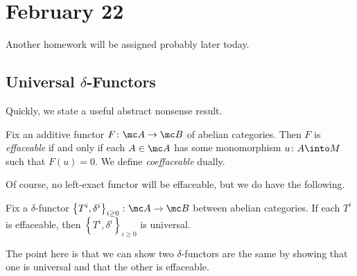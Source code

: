 \documentclass[../notes.tex]{subfiles}
\begin{document}
\section{February 22}

Another homework will be assigned probably later today.

\subsection{Universal \texorpdfstring{$\delta$}{ Delta}-Functors}
Quickly, we state a useful abstract nonsense result.
\begin{definition}[effaceable]
	Fix an additive functor $F\colon\mc A\to\mc B$ of abelian categories. Then $F$ is \textit{effaceable} if and only if each $A\in\mc A$ has some monomorphism $u\colon A\into M$ such that $F(u)=0$. We define \textit{coeffaceable} dually.
\end{definition}
Of course, no left-exact functor will be effaceable, but we do have the following.
\begin{theorem}[Grothendeick]
	Fix a $\delta$-functor $\left\{T^i,\delta^i\right\}_{i\ge0}\colon\mc A\to\mc B$ between abelian categories. If each $T^i$ is effaceable, then $\left\{T^i,\delta^i\right\}_{i\ge0}$ is universal.
\end{theorem}
The point here is that we can show two $\delta$-functors are the same by showing that one is universal and that the other is effaceable.
\end{document}
